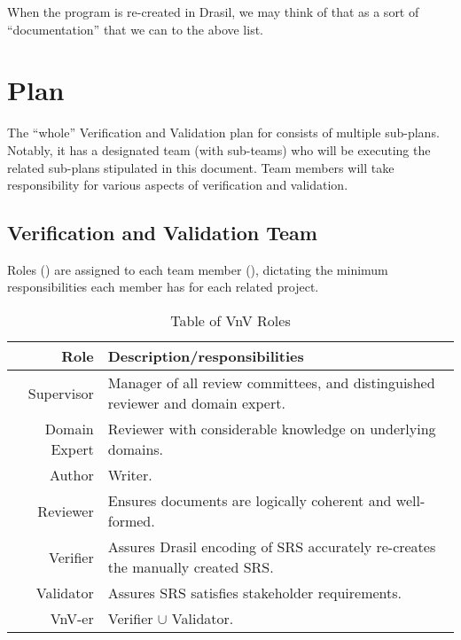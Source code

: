 \documentclass[12pt, titlepage]{article}
\begin{document}
\noindent{}When the \progname{} program is re-created in Drasil, we may think of
that as a sort of ``documentation'' that we can to the above list.

\newpage{}

\section{Plan}

The ``whole'' Verification and Validation plan for \progname{} consists of
multiple sub-plans. Notably, it has a designated team (with sub-teams) who will
be executing the related sub-plans stipulated in this document. Team members
will take responsibility for various aspects of verification and validation.

\subsection{Verification and Validation Team}

Roles () are assigned to each team member
(), dictating the minimum responsibilities each member
has for each related project.

\begin{longtable}{|r|p{8cm}|}
    \caption{Table of VnV Roles}
    \label{table:vnv_roles}

    \\ \hline
    \rowcolor{Maroon}
    \textbf{Role}        & \textbf{Description/responsibilities}                                           \\ \hline
    \rowcolor{White}
    Supervisor           & Manager of all review committees, and distinguished reviewer and domain expert. \\ \hline
    Domain Expert        & Reviewer with considerable knowledge on underlying domains.                     \\ \hline
    Author               & Writer.                                                                         \\ \hline
    Reviewer             & Ensures documents are logically coherent and well-formed.                       \\ \hline
    Verifier             & Assures Drasil encoding of SRS accurately re-creates the manually created SRS.  \\ \hline
    Validator            & Assures SRS satisfies stakeholder requirements.                                 \\ \hline
    VnV-er               & Verifier \(\cup\) Validator.                                                    \\ \hline
\end{longtable}
\end{document}
